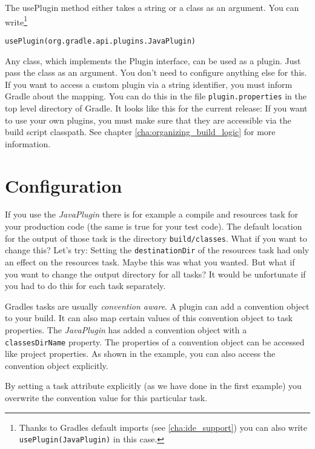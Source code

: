 \noindent The usePlugin method either takes a string or a class as an argument. You can write\footnote{Thanks to Gradles default imports (see \ref{cha:ide_support}) you can also write \texttt{usePlugin(JavaPlugin)} in this case.}
\begin{Verbatim}
usePlugin(org.gradle.api.plugins.JavaPlugin)
\end{Verbatim} 
Any class, which implements the Plugin interface, can be used as a plugin. Just pass the class as an argument. You don't need to configure anything else for this. If you want to access a custom plugin via a string identifier, you must inform Gradle about the mapping. You can do this in the file \texttt{plugin.properties} in the top level directory of Gradle. It looks like this for the current release:
If you want to use your own plugins, you must make sure that they are accessible via the build script classpath. See chapter \ref{cha:organizing_build_logic} for more information.

\section{Configuration} %
\label{sec:configuration}
If you use the \emph{JavaPlugin} there is for example a compile and resources task for your production code (the same is true for your test code). The default location for the output of those task is the directory \texttt{build/classes}. What if you want to change this? Let's try:
Setting the \texttt{destinationDir} of the resources task had only an effect on the resources task. Maybe this was what you wanted. But what if you want to change the output directory for all tasks? It would be unfortunate if you had to do this for each task separately. 

Gradles tasks are usually \emph{convention aware}. A plugin can add a convention object to your build. It can also map certain values of this convention object to task properties.
The \emph{JavaPlugin} has added a convention object with a \texttt{classesDirName} property. The properties of a convention object can be accessed like project properties. As shown in the example, you can also access the convention object explicitly.

By setting a task attribute explicitly (as we have done in the first example) you overwrite the convention value for this particular task.

